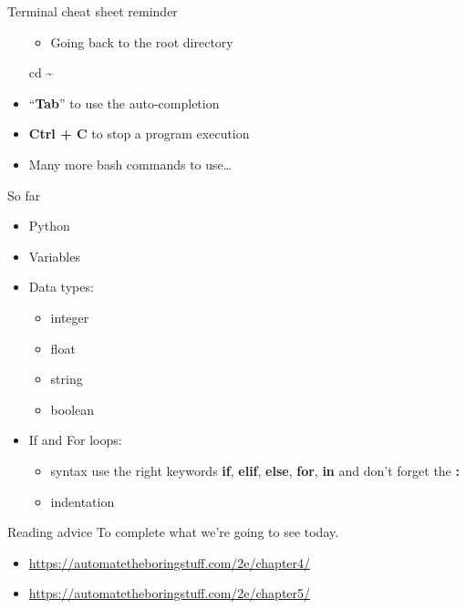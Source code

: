 \documentclass[
  8pt,
  ignorenonframetext,
]{beamer}
\newenvironment{Shaded}{\begin{snugshade}}{\end{snugshade}}
\newcommand{\BuiltInTok}[1]{#1}
\newcommand{\NormalTok}[1]{#1}
\providecommand{\tightlist}{%
  \setlength{\itemsep}{0pt}\setlength{\parskip}{0pt}}
\begin{document}
\begin{frame}[fragile]{Terminal cheat sheet reminder}
\begin{itemize}
  \begin{itemize}
  \tightlist
  \item
    Going back to the root directory
  \end{itemize}

\begin{Shaded}
\begin{Highlighting}[]
\BuiltInTok{cd}\NormalTok{ \textasciitilde{}}
\end{Highlighting}
\end{Shaded}
\item
  ``\textbf{Tab}'' to use the auto-completion
\item
  \textbf{Ctrl + C} to stop a program execution
\item
  Many more bash commands to use\ldots{}
\end{itemize}
\end{frame}

\begin{frame}{So far}
\protect\hypertarget{so-far}{}
\begin{itemize}
\item
  Python
\item
  Variables
\item
  Data types:

  \begin{itemize}
  \tightlist
  \item
    integer
  \item
    float
  \item
    string
  \item
    boolean
  \end{itemize}
\item
  If and For loops:

  \begin{itemize}
  \tightlist
  \item
    syntax use the right keywords \textbf{if}, \textbf{elif},
    \textbf{else}, \textbf{for}, \textbf{in} and don't forget the
    \textbf{:}
  \item
    indentation
  \end{itemize}
\end{itemize}
\end{frame}

\begin{frame}{Reading advice}
\protect\hypertarget{reading-advice}{}
To complete what we're going to see today.

\begin{itemize}
\item
  \url{https://automatetheboringstuff.com/2e/chapter4/}
\item
  \url{https://automatetheboringstuff.com/2e/chapter5/}
\end{itemize}
\end{frame}
\end{document}
